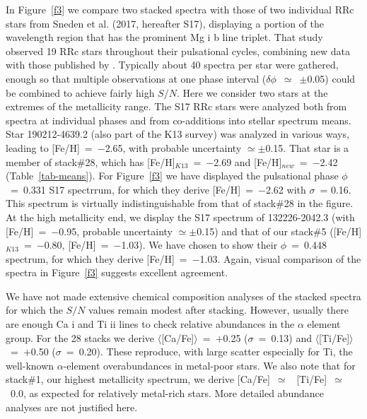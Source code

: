 \documentclass[preprint]{aastex6}
\newcommand\species[2]{#1 {\sc #2}}
\begin{document}
In Figure~\ref{f3} we compare two 
stacked spectra with those of two individual RRc stars from 
\nocite{sneden17}Sneden et al. (2017, hereafter S17), displaying a portion of 
the wavelength region that has the prominent \species{Mg}{i} b line triplet. 
That study observed 19 RRc stars throughout their pulsational cycles, 
combining new data with those published by \cite{govea14}.
Typically about 40 spectra per star were gathered, enough so that multiple 
observations at one phase interval ($\delta\phi$~$\simeq$~$\pm$0.05) 
could be combined to achieve fairly high $S/N$. 
Here we consider two stars at the extremes of the \citeauthor{sneden17} 
metallicity range. 
The S17 RRc stars were analyzed both from spectra at individual phases 
and from co-additions into stellar spectrum means.
Star 190212-4639.2 (also part of the K13 survey) was analyzed in
various ways, leading to [Fe/H]~=~$-$2.65, with probable uncertainty 
$\simeq\pm$0.15.
That star is a member of stack\#28, which has [Fe/H]$_{K13}$~=~$-$2.69 
and [Fe/H]$_{new}$~=~$-$2.42 (Table~\ref{tab-means}).
For Figure~\ref{f3} we have displayed the 
pulsational phase $\phi$~=~0.331 S17 spectrrum, for which they derive
[Fe/H]~=~$-$2.62 with $\sigma$~= 0.16.
This spectrum is virtually indistinguishable from that of stack\#28 
in the figure.
At the high metallicity end, we display the 
S17 spectrum of 132226-2042.3 (with [Fe/H]~=~$-$0.95, probable uncertainty 
$\simeq\pm$0.15) and that of our stack\#5 ([Fe/H]$_{K13}$~=~$-$0.80,
[Fe/H]~=~$-$1.03).
We have chosen to show their $\phi$~=~0.448 spectrum, for which they 
derive [Fe/H]~=~$-$1.03.
Again, visual comparison of the spectra in Figure~\ref{f3}
suggests excellent agreement.

We have not made extensive chemical composition analyses of the stacked 
spectra for which the $S/N$ values remain modest after stacking.
However, usually there are enough \species{Ca}{i} and \species{Ti}{ii} 
lines to check relative abundances in the $\alpha$ element group.
For the 28 stacks we derive $\langle$[Ca/Fe]$\rangle$~=~$+$0.25 
($\sigma$~=~0.13) and $\langle$[Ti/Fe]$\rangle$~=~$+$0.50 ($\sigma$~=~0.20).
These reproduce, with large scatter especially for Ti, the well-known
$\alpha$-element overabundances in metal-poor stars.  
We also note that for stack\#1, our highest metallicity spectrum,
we derive [Ca/Fe]~$\simeq$~ [Ti/Fe]~$\simeq$~0.0, as expected for relatively
metal-rich stars.
More detailed abundance analyses are not justified here.
\end{document}
